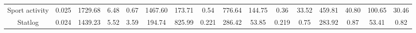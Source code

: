 \begin{table*}[!htb]
{\begin{tabular}{|c||ccc||ccc||ccc||cccccc|}
	Sport activity & \cellcolor{gray!66} 0.025 & \cellcolor{gray!33} 1729.68 & 6.48 & \cellcolor{gray!66} 0.67 & \cellcolor{gray!33} 1467.60 & 173.71 & \cellcolor{gray!66} 0.54 & \cellcolor{gray!33} 776.64 & 144.75 & \cellcolor{gray!66} 0.36 & \cellcolor{gray!66} 33.52 & \cellcolor{gray!33} 459.81 & \cellcolor{gray!33} 40.80 & 100.65 & 30.46 \\
	Statlog & \cellcolor{gray!66} 0.024 & \cellcolor{gray!33} 1439.23 & 5.52 & \cellcolor{gray!66} 3.59 & \cellcolor{gray!33} 194.74 & 825.99 & \cellcolor{gray!66} 0.221 & \cellcolor{gray!33} 286.42 & 53.85 & \cellcolor{gray!66} 0.219 & \cellcolor{gray!66} 0.75 & \cellcolor{gray!33} 283.92 & \cellcolor{gray!33} 0.87 & 53.41 & 0.82 \\
 	\hline
	\end{tabular}
}
\vspace{-0.3cm}
\end{table*} 